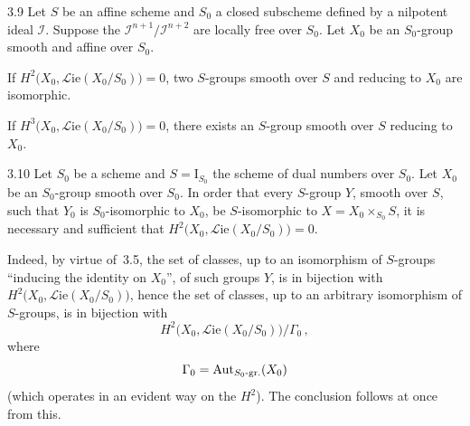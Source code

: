 \begin{corollary}{3.9}\label{III.3.9}
Let \(S\) be an affine scheme and \(S_{0}\) a closed subscheme defined by a
nilpotent ideal \(\mathcal{I}\). Suppose the
\(\mathcal{I}^{n+1}/\mathcal{I}^{n+2}\) are locally free over \(S_{0}\).
Let \(X_{0}\) be an \(S_{0}\)-group smooth and affine over
\(S_{0}\).%
\begin{enumeratei}
\item If \(H^{2}\bigl(X_{0},\mathcal{L}\mathrm{ie}(X_{0}/S_{0})\bigr)=0\),
two \(S\)-groups smooth over \(S\) and reducing to \(X_{0}\) are isomorphic.
\item If \(H^{3}\bigl(X_{0},\mathcal{L}\mathrm{ie}(X_{0}/S_{0})\bigr)=0\),
there exists an \(S\)-group smooth over \(S\) reducing to \(X_{0}\).
\end{enumeratei}
\end{corollary}

\begin{corollary}{3.10}\label{III.3.10}
Let \(S_{0}\) be a scheme and \(S=\mathrm{I}_{S_{0}}\) the scheme of dual
numbers over \(S_{0}\). Let \(X_{0}\) be an \(S_{0}\)-group smooth over
\(S_{0}\). In order that every \(S\)-group \(Y\), smooth over \(S\), such
that \(Y_{0}\) is \(S_{0}\)-isomorphic to \(X_{0}\), be \(S\)-isomorphic to
\(X=X_{0}\times_{S_{0}}S\), it is necessary and sufficient that
\(H^{2}\bigl(X_{0},\mathcal{L}\mathrm{ie}(X_{0}/S_{0})\bigr)=0\).%
{\renewcommand{\thefootnote}{(72)}}
\end{corollary}

Indeed, by virtue of~3.5, the set of classes, up to an isomorphism of
\(S\)-groups ``inducing the identity on \(X_{0}\)'', of such groups \(Y\),
is in bijection with
\(H^{2}\bigl(X_{0},\mathcal{L}\mathrm{ie}(X_{0}/S_{0})\bigr)\), hence the
set of classes, up to an arbitrary isomorphism of \(S\)-groups, is in
bijection with
\[
H^{2}\bigl(X_{0},\mathcal{L}\mathrm{ie}(X_{0}/S_{0})\bigr)/\Gamma_{0}\,,
\]
where
\[
\Gamma_{0}=\operatorname{Aut}_{S_{0}\text{-gr.}}(X_{0})
\]
(which operates in an evident way on the \(H^{2}\)). The conclusion follows
at once from this.%
{\renewcommand{\thefootnote}{(73)}}

